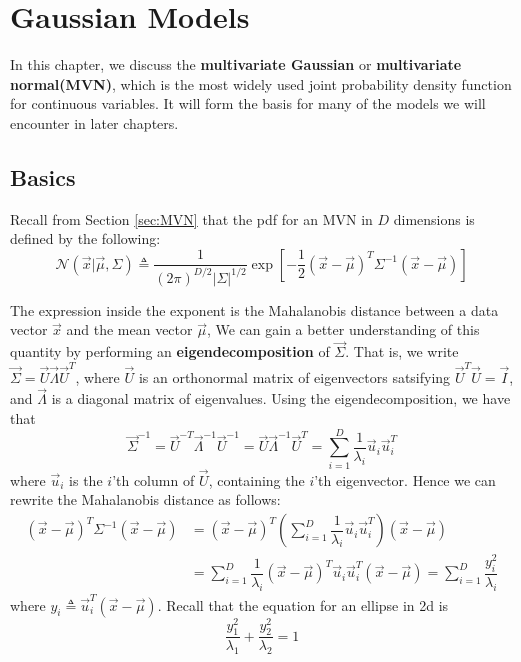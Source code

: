 \chapter{Gaussian Models}
\label{chap:MVN}

In this chapter, we discuss the \textbf{multivariate Gaussian} or \textbf{multivariate normal(MVN)}, which is the most widely used joint probability density function for continuous variables. It will form the basis for many of the models we will encounter in later chapters.


\section{Basics}
Recall from Section \ref{sec:MVN} that the pdf for an MVN in $D$ dimensions is defined by the following:
\begin{equation}
\mathcal{N}(\vec{x}|\vec{\mu},\Sigma) \triangleq \dfrac{1}{(2\pi)^{D/2}|\Sigma|^{1/2}}\exp\left[-\dfrac{1}{2}(\vec{x}-\vec{\mu})^T\Sigma^{-1}(\vec{x}-\vec{\mu})\right]
\end{equation}

The expression inside the exponent is the Mahalanobis distance between a data vector $\vec{x}$ and the mean vector $\vec{\mu}$, We can gain a better understanding of this quantity by performing an \textbf{eigendecomposition} of $\vec{\Sigma}$. That is, we write $\vec{\Sigma}=\vec{U}\vec{\Lambda}\vec{U}^T$, where $\vec{U}$ is an orthonormal matrix of eigenvectors satsifying $\vec{U}^T\vec{U}=\vec{I}$, and $\vec{\Lambda}$ is a diagonal matrix of eigenvalues. Using the eigendecomposition, we have that
\begin{equation}
\vec{\Sigma}^{-1}=\vec{U}^{-T}\vec{\Lambda}^{-1}\vec{U}^{-1}=\vec{U}\vec{\Lambda}^{-1}\vec{U}^T=\sum\limits_{i=1}^D \dfrac{1}{\lambda_i}\vec{u}_i\vec{u}_i^T
\end{equation}
where $\vec{u}_i$ is the $i$’th column of $\vec{U}$, containing the $i$’th eigenvector. Hence we can rewrite the Mahalanobis distance as follows:
\begin{align}
(\vec{x}-\vec{\mu})^T\Sigma^{-1}(\vec{x}-\vec{\mu})& =(\vec{x}-\vec{\mu})^T\left(\sum\limits_{i=1}^D \dfrac{1}{\lambda_i}\vec{u}_i\vec{u}_i^T\right)(\vec{x}-\vec{\mu}) \\
    & =\sum\limits_{i=1}^D \dfrac{1}{\lambda_i}(\vec{x}-\vec{\mu})^T\vec{u}_i\vec{u}_i^T(\vec{x}-\vec{\mu})=\sum\limits_{i=1}^D \dfrac{y_i^2}{\lambda_i}
\end{align}
where $y_i \triangleq \vec{u}_i^T(\vec{x}-\vec{\mu})$. Recall that the equation for an ellipse in 2d is
\begin{equation}
\dfrac{y_1^2}{\lambda_1}+\dfrac{y_2^2}{\lambda_2}=1
\end{equation}

